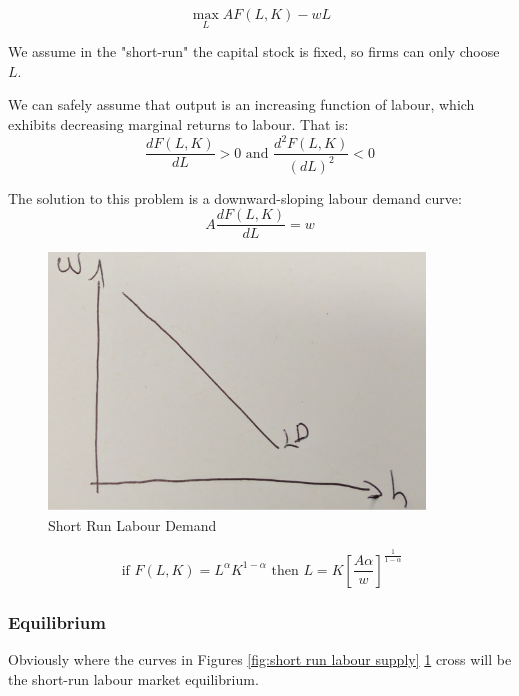 \documentclass[11pt]{article}
\begin{document}
\[\underset{L}{\max}AF(L,K) - wL\]

\begin{note}
    We assume in the "short-run" the capital stock is fixed, so firms can only choose $L$.
\end{note}

We can safely assume that output is an increasing function of labour, which exhibits decreasing marginal returns to labour. That is:
\begin{equation}
\frac{d F(L, K)}{d L}>0 \text { and  } \frac{d^2 F(L, K)}{(d L)^2}<0
\end{equation}

The solution to this problem is a downward-sloping labour demand curve:
\begin{equation}
A \frac{d F(L, K)}{d L}=w
\end{equation}

\begin{figure}[h]
    \centering
    \includegraphics[width=10cm]{photos/short run labour demand.png}
    \caption{Short Run Labour Demand}
    \label{fig:short run labour demand.}
\end{figure}

\begin{example}
    \begin{equation}
\text { if } F(L, K)=L^\alpha K^{1-\alpha} \text { then } L=K\left[\frac{A \alpha}{w}\right]^{\frac{1}{1-\alpha}}
\end{equation}
\end{example}
\subsubsection{Equilibrium}
Obviously where the curves in Figures \ref{fig:short run labour supply} \ref{fig:short run labour demand.} cross will be the short-run labour market equilibrium.
\end{document}
